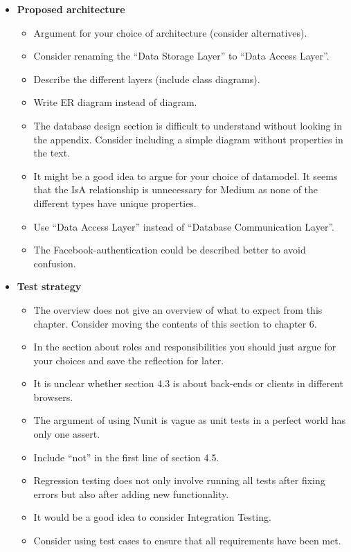 \documentclass[]{article}
\begin{document}
\begin{itemize}
\item \textbf{Proposed architecture}
	\begin{itemize}
	\item Argument for your choice of architecture (consider alternatives).
	\item Consider renaming the ``Data Storage Layer'' to ``Data Access Layer''.
	\item Describe the different layers (include class diagrams).
	\item Write ER diagram instead of diagram.
	\item The database design section is difficult to understand without looking in the appendix. Consider including a simple diagram without properties in the text.
	\item It might be a good idea to argue for your choice of datamodel. It seems that the IsA relationship is unnecessary for Medium as none of the different types have unique properties.
	\item Use ``Data Access Layer'' instead of ``Database Communication Layer''.
	\item The Facebook-authentication could be described better to avoid confusion.
	\end{itemize}

\item \textbf{Test strategy}
	\begin{itemize}
	\item The overview does not give an overview of what to expect from this chapter. Consider moving the contents of this section to chapter 6.
	\item In the section about roles and responsibilities you should just argue for your choices and save the reflection for later.
	\item It is unclear whether section 4.3 is about back-ends or clients in different browsers.
	\item The argument of using Nunit is vague as unit tests in a perfect world has only one assert.
	\item Include ``not'' in the first line of section 4.5.
	\item Regression testing does not only involve running all tests after fixing errors but also after adding new functionality.
	\item It would be a good idea to consider Integration Testing.
	\item Consider using test cases to ensure that all requirements have been met.
	\end{itemize}


\end{itemize}
\end{document}
